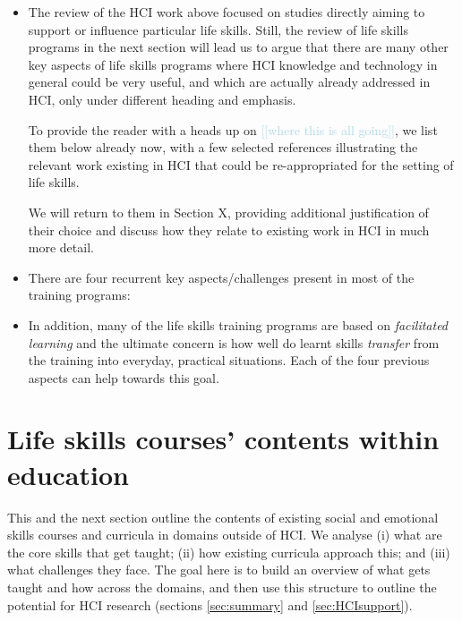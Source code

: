 \documentclass[prodmode,acmtochi]{acmsmall}
\newcommand{\todo}[1]{\textrm{\textrm{\textcolor{LightBlue}{[[#1]]}}}}
\begin{document}
\begin{itemize}
\begin{itemize}
        \end{itemize}

\item The review of the HCI work above focused on studies directly aiming to support or influence particular life skills. Still, the review of life skills programs in the next section will lead us to argue that there are many other key aspects of life skills programs where HCI knowledge and technology in general could be very useful, and which are actually already addressed in HCI, only under different heading and emphasis.  
        
        To provide the reader with a heads up on \todo{where this is all going}, we list them below already now, with a few selected references illustrating the relevant work existing in HCI that could be re-appropriated for the setting of life skills. 
        
        We will return to them in Section X, providing additional justification of their choice and discuss how they relate to existing work in HCI in much more detail.
\item There are four recurrent key aspects/challenges present in most of the training programs: 

\item In addition, many of the life skills training programs are based on \emph{facilitated learning} and the ultimate concern is how well do learnt skills {\em transfer} from the training into everyday, practical situations. Each of the four previous aspects can help towards this goal. 

\end{itemize}
\fi

\section{Life skills courses' contents within education}
\label{sec:SEL}

        This and the next section outline the contents of existing social and emotional skills courses and curricula in domains outside of HCI. We analyse (i) what are the core skills that get taught; (ii) how  existing curricula approach this; and (iii) what challenges they face.    The goal here is to build an overview of what gets taught and how across the domains, and then use this structure to outline the potential for HCI research (sections \ref{sec:summary} and \ref{sec:HCIsupport}). 
        
\end{document}
